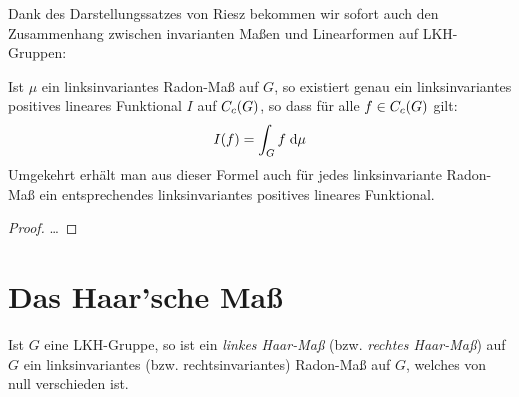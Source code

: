 \bigskip
Dank des Darstellungssatzes von Riesz bekommen wir sofort auch den Zusammenhang
zwischen invarianten Maßen und Linearformen auf LKH-Gruppen:
\begin{thLemma}
    Ist $\mu$ ein linksinvariantes Radon-Maß auf $G$, so existiert genau ein
    linksinvariantes positives lineares Funktional $I$ auf $C_c(G)$, 
    so dass für alle $f\in C_c(G)$ gilt:
    \[ I(f) = \int_G f \;\mathrm{d} \mu \]
    Umgekehrt erhält man aus dieser Formel auch für jedes linksinvariante
    Radon-Maß ein entsprechendes linksinvariantes positives lineares Funktional.
\end{thLemma}

\begin{proof}
    \ldots %
\end{proof}


\section{Das Haar'sche Maß}
\begin{thDef}
    Ist $G$ eine LKH-Gruppe, so ist ein \emph{linkes Haar-Maß} (bzw.
    \emph{rechtes Haar-Maß}) auf $G$ ein linksinvariantes (bzw.
    rechtsinvariantes) Radon-Maß auf $G$, welches von null verschieden ist.
\end{thDef}




































